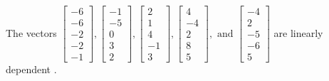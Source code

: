 \begin{exercise}
\begin{exerciseStatement}
  \end{exerciseStatement}
  \begin{exerciseAnswer}
   The vectors \(\left[\begin{array}{r}
-6 \\
-6 \\
-2 \\
-2 \\
-1
\end{array}\right] , \left[\begin{array}{r}
-1 \\
-5 \\
0 \\
3 \\
2
\end{array}\right] , \left[\begin{array}{r}
2 \\
1 \\
4 \\
-1 \\
3
\end{array}\right] , \left[\begin{array}{r}
4 \\
-4 \\
2 \\
8 \\
5
\end{array}\right] , \text{ and } \left[\begin{array}{r}
-4 \\
2 \\
-5 \\
-6 \\
5
\end{array}\right]\) are 
  	 linearly dependent  .
  


  \end{exerciseAnswer}
\end{exercise}